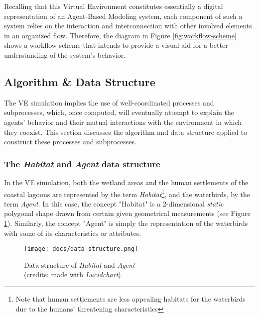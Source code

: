 Recalling that this Virtual Environment constitutes essentially a digital representation of an Agent-Based Modeling system, each component of such a system relies on the interaction and interconnection with other involved elements in an organized flow. Therefore, the diagram in Figure \ref{fig:workflow-scheme} shows a workflow scheme that intends to provide a visual aid for a better understanding of the system's behavior.

\subsection{Algorithm \& Data Structure}
The VE simulation implies the use of well-coordinated processes and subprocesses, which, once computed, will eventually attempt to explain the agents' behavior and their mutual interactions with the environment in which they coexist. This section discusses the algorithm and data structure applied to construct these processes and subprocesses.

\subsubsection{The \emph{Habitat} and \emph{Agent} data structure}
In the VE simulation, both the wetland areas and the human settlements of the coastal lagoons are represented by the term \emph{Habitat}\footnote{Note that human settlements are less appealing habitats for the waterbirds due to the humans' threatening characteristics}, and the waterbirds, by the term \emph{Agent}. In this case, the concept "Habitat"  is a 2-dimensional \emph{static} polygonal shape drawn from certain given geometrical measurements (see Figure \ref{fig:data-structure}). Similarly, the concept "Agent" is simply the representation of the waterbirds with some of its characteristics or attributes.

\begin{figure}[h!]
    \centering
    \texttt{[image: docs/data-structure.png]}
    \caption{Data structure of \emph{Habitat} and \emph{Agent} \\ (credits: made with \emph{Lucidchart})}
    \label{fig:data-structure}
\end{figure}

